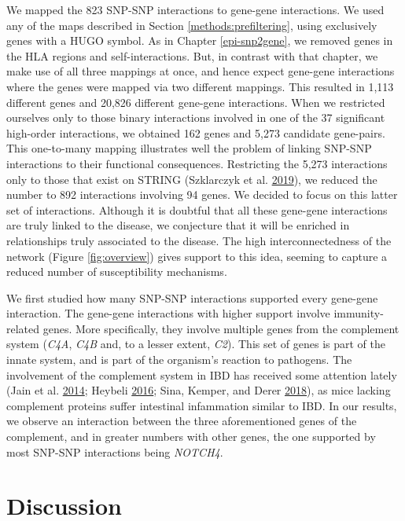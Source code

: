 \documentclass[
  11pt,
]{env/yjiao}
\begin{document}
We mapped the 823 SNP-SNP interactions to gene-gene interactions. We used any of the maps described in Section \ref{methods:prefiltering}, using exclusively genes with a HUGO symbol. As in Chapter \ref{epi-snp2gene}, we removed genes in the HLA regions and self-interactions. But, in contrast with that chapter, we make use of all three mappings at once, and hence expect gene-gene interactions where the genes were mapped via two different mappings. This resulted in 1,113 different genes and 20,826 different gene-gene interactions. When we restricted ourselves only to those binary interactions involved in one of the 37 significant high-order interactions, we obtained 162 genes and 5,273 candidate gene-pairs. This one-to-many mapping illustrates well the problem of linking SNP-SNP interactions to their functional consequences. Restricting the 5,273 interactions only to those that exist on STRING (Szklarczyk et al. \protect\hyperlink{ref-szklarczyk_string_2019}{2019}), we reduced the number to 892 interactions involving 94 genes. We decided to focus on this latter set of interactions. Although it is doubtful that all these gene-gene interactions are truly linked to the disease, we conjecture that it will be enriched in relationships truly associated to the disease. The high interconnectedness of the network (Figure \ref{fig:overview}) gives support to this idea, seeming to capture a reduced number of susceptibility mechanisms.

We first studied how many SNP-SNP interactions supported every gene-gene interaction. The gene-gene interactions with higher support involve immunity-related genes. More specifically, they involve multiple genes from the complement system (\emph{C4A}, \emph{C4B} and, to a lesser extent, \emph{C2}). This set of genes is part of the innate system, and is part of the organism's reaction to pathogens. The involvement of the complement system in IBD has received some attention lately (Jain et al. \protect\hyperlink{ref-jain_complement_2014}{2014}; Heybeli \protect\hyperlink{ref-heybeli_complement_2016}{2016}; Sina, Kemper, and Derer \protect\hyperlink{ref-sina_intestinal_2018}{2018}), as mice lacking complement proteins suffer intestinal infammation similar to IBD. In our results, we observe an interaction between the three aforementioned genes of the complement, and in greater numbers with other genes, the one supported by most SNP-SNP interactions being \emph{NOTCH4}.

\hypertarget{discussion-1}{%
\section{Discussion}\label{discussion-1}}
\end{document}
